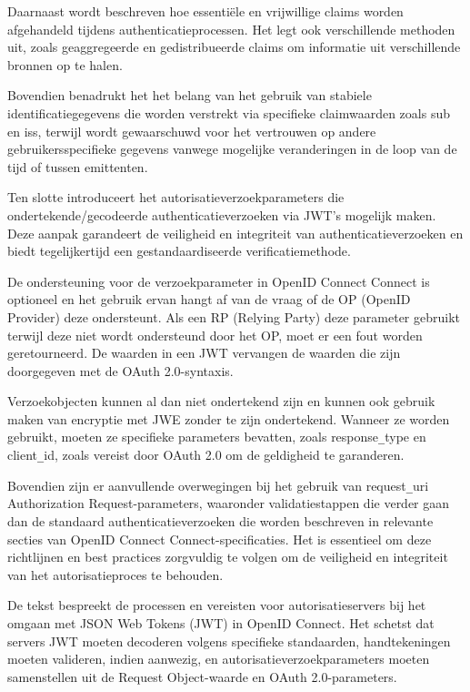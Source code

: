 Daarnaast wordt beschreven hoe essentiële en vrijwillige claims worden afgehandeld tijdens authenticatieprocessen. Het legt ook verschillende methoden uit, zoals geaggregeerde en gedistribueerde claims om informatie uit verschillende bronnen op te halen.

Bovendien benadrukt het het belang van het gebruik van stabiele identificatiegegevens die worden verstrekt via specifieke claimwaarden zoals sub en iss, terwijl wordt gewaarschuwd voor het vertrouwen op andere gebruikersspecifieke gegevens vanwege mogelijke veranderingen in de loop van de tijd of tussen emittenten.

Ten slotte introduceert het autorisatieverzoekparameters die ondertekende/gecodeerde authenticatieverzoeken via JWT's mogelijk maken.
  Deze aanpak garandeert de veiligheid en integriteit van authenticatieverzoeken en biedt tegelijkertijd een gestandaardiseerde verificatiemethode.

De ondersteuning voor de verzoekparameter in OpenID Connect Connect is optioneel en het gebruik ervan hangt af van de vraag of de OP (OpenID Provider) deze ondersteunt. Als een RP (Relying Party) deze parameter gebruikt terwijl deze niet wordt ondersteund door het OP, moet er een fout worden geretourneerd. De waarden in een JWT vervangen de waarden die zijn doorgegeven met de OAuth 2.0-syntaxis.

Verzoekobjecten kunnen al dan niet ondertekend zijn en kunnen ook gebruik maken van encryptie met JWE zonder te zijn ondertekend. Wanneer ze worden gebruikt, moeten ze specifieke parameters bevatten, zoals response\verb|_|type en client\verb|_|id, zoals vereist door OAuth 2.0 om de geldigheid te garanderen.

Bovendien zijn er aanvullende overwegingen bij het gebruik van request\verb|_|uri Authorization Request-parameters, waaronder validatiestappen die verder gaan dan de standaard authenticatieverzoeken die worden beschreven in relevante secties van OpenID Connect Connect-specificaties.
Het is essentieel om deze richtlijnen en best practices zorgvuldig te volgen om de veiligheid en integriteit van het autorisatieproces te behouden.

De tekst bespreekt de processen en vereisten voor autorisatieservers bij het omgaan met JSON Web Tokens (JWT) in OpenID Connect. Het schetst dat servers JWT moeten decoderen volgens specifieke standaarden, handtekeningen moeten valideren, indien aanwezig, en autorisatieverzoekparameters moeten samenstellen uit de Request Object-waarde en OAuth 2.0-parameters.

